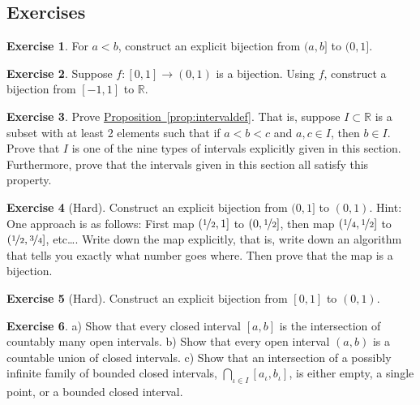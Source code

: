 \documentclass[12pt]{book}
\newcommand{\R}{{\mathbb{R}}}
\newcommand{\N}{{\mathbb{N}}}
\newcommand{\sP}{{\mathcal{P}}}
\theoremstyle{plain}
\theoremstyle{remark}
\theoremstyle{definition}
\theoremstyle{exercise}
\newtheorem{exercise}{Exercise}[section]
\theoremstyle{example}
\newcommand{\propref}[1]{\hyperref[#1]{Proposition~\ref*{#1}}}
\begin{document}
\subsection{Exercises}

\begin{exercise}
For $a < b$, construct an explicit bijection from $(a,b]$ to $(0,1]$.
\end{exercise}

\begin{exercise}
Suppose $f \colon [0,1] \to (0,1)$ is a bijection.
Using $f$, construct a
bijection from $[-1,1]$ to $\R$.
\end{exercise}


\begin{exercise} \label{exercise:intervaldef}
Prove \propref{prop:intervaldef}.
That is,
suppose $I \subset \R$ is a subset with at least 2 elements
such that if $a < b < c$ and $a, c \in I$, then $b \in I$.
Prove that $I$ is one of the nine types of intervals explicitly
given in this section.
Furthermore, prove that the intervals given in this section
all satisfy this property.
\end{exercise}

\begin{exercise}[Hard]
Construct an explicit bijection from $(0,1]$ to $(0,1)$.
Hint: One approach is as follows: First map $(\nicefrac{1}{2},1]$
to $(0,\nicefrac{1}{2}]$, then map
$(\nicefrac{1}{4},\nicefrac{1}{2}]$
to $(\nicefrac{1}{2},\nicefrac{3}{4}]$, etc\ldots.
Write down the map explicitly, that
is, write down an algorithm that tells you exactly what number goes where.
Then prove that the map is a bijection.
\end{exercise}

\begin{exercise}[Hard]
Construct an explicit bijection from $[0,1]$ to $(0,1)$.
\end{exercise}

\begin{exercise}
a) Show that every closed interval $[a,b]$ is the intersection
of countably many open intervals.  b) Show that every open interval $(a,b)$
is a countable union of closed intervals.  c) Show that an intersection
of a possibly infinite family of bounded closed intervals,
$\bigcap\limits_{\iota \in I} [a_\iota,b_\iota]$,
is either empty, a single point,
or a bounded closed interval.
\end{exercise}
\end{document}
